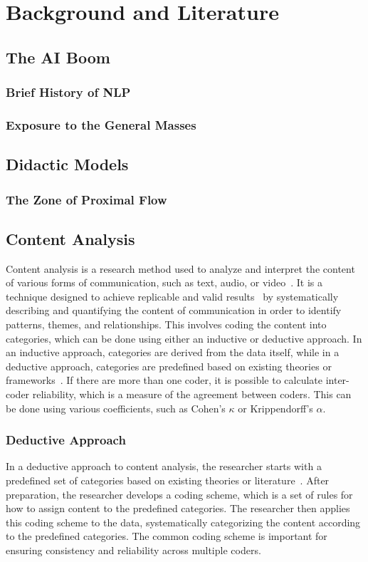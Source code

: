 \chapter{Background and Literature}
\section{The AI Boom}
\subsection{Brief History of NLP}
\subsection{Exposure to the General Masses}

\section{Didactic Models}
\subsection{The Zone of Proximal Flow}

\section{Content Analysis}
Content analysis is a research method used to analyze and interpret the content of various forms of communication, such as text, audio, or video\ \cite{elo_qualitative_2008}. It is a technique designed to achieve replicable and valid results\ \cite{krippendorff_content_2004} by systematically describing and quantifying the content of communication in order to identify patterns, themes, and relationships. This involves coding the content into categories, which can be done using either an inductive or deductive approach. In an inductive approach, categories are derived from the data itself, while in a deductive approach, categories are predefined based on existing theories or frameworks\ \cite{elo_qualitative_2008}. If there are more than one coder, it is possible to calculate inter-coder reliability, which is a measure of the agreement between coders. This can be done using various coefficients, such as Cohen's \(\kappa \) or Krippendorff's \(\alpha \).

\subsection{Deductive Approach}
In a deductive approach to content analysis, the researcher starts with a predefined set of categories based on existing theories or literature\ \cite{elo_qualitative_2008}. After preparation, the researcher develops a coding scheme, which is a set of rules for how to assign content to the predefined categories. The researcher then applies this coding scheme to the data, systematically categorizing the content according to the predefined categories. The common coding scheme is important for ensuring consistency and reliability across multiple coders.

